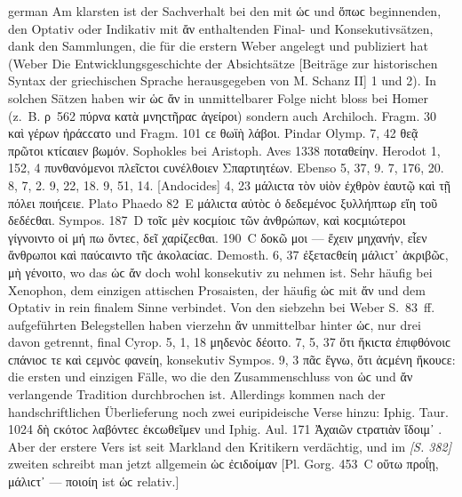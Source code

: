 \begin{otherlanguage*}{german}
Am klarsten ist der Sachverhalt bei den mit ὡϲ und ὅπωϲ beginnenden, den Optativ oder Indikativ mit ἄν enthaltenden Final- und Konsekutivsätzen, dank den Sammlungen, die für die erstern Weber angelegt und publiziert hat (Weber Die Entwicklungsgeschichte der Absichtsätze [Beiträge zur historischen Syntax der griechischen Sprache herausgegeben von M. Schanz II] 1 und 2). In solchen Sätzen haben wir ὡϲ ἄν in unmittelbarer Folge nicht bloss bei Homer (z.~B. ρ~562  πύρνα κατὰ μνηϲτῆραϲ ἀγείροι) sondern auch Archiloch. Fragm. 30  καὶ γέρων ἠράϲϲατο und Fragm. 101  ϲε θωϊὴ λάβοι. Pindar Olymp. 7, 42  θεᾷ πρῶτοι κτίϲαιεν βωμόν. Sophokles bei Aristoph. Aves 1338  ποταθείην. Herodot 1, 152, 4  πυνθανόμενοι πλεῖϲτοι ϲυνέλθοιεν Σπαρτιητέων. Ebenso 5, 37, 9. 7, 176, 20. 8, 7, 2. 9, 22, 18. 9, 51, 14. [Andocides] 4, 23  μάλιϲτα τὸν υἱὸν ἐχθρὸν ἑαυτῷ καὶ τῇ πόλει ποιήϲειε. Plato Phaedo 82~Ε  μάλιϲτα αὐτὸϲ ὁ δεδεμένοϲ ξυλλήπτωρ εἴη τοῦ δεδέϲθαι. Sympos. 187~D τοῖϲ μὲν κοϲμίοιϲ τῶν ἀνθρώπων, καὶ  κοϲμιώτεροι γίγνοιντο οἱ μή πω ὄντεϲ, δεῖ χαρίζεϲθαι. 190~C δοκῶ μοι — ἔχειν μηχανήν,  εἶεν ἄνθρωποι καὶ παύϲαιντο τῆϲ ἀκολαϲίαϲ. Demosth. 6, 37  ἐξεταϲθείη μάλιϲτ᾽ ἀκριβῶϲ, μὴ γένοιτο, wo das ὡϲ ἄν doch wohl konsekutiv zu nehmen ist. Sehr häufig bei Xenophon, dem einzigen attischen Prosaisten, der häufig ὡϲ mit ἄν und dem Optativ in rein finalem Sinne verbindet. Von den siebzehn bei Weber S.~83~ff. aufgeführten Belegstellen haben vierzehn ἄν unmittelbar hinter ὡϲ, nur drei davon getrennt, final Cyrop. 5, 1, 18  μηδενὸϲ  δέοιτο. 7, 5, 37  ὅτι ἥκιϲτα  ἐπιφθόνοιϲ ϲπάνιοϲ τε καὶ ϲεμνὸϲ φανείη, konsekutiv Sympos. 9, 3  πᾶϲ  ἔγνω, ὅτι ἀϲμένη ἤκουϲε: die ersten und einzigen Fälle, wo die den Zusammenschluss von ὡϲ und ἄν verlangende Tradition durchbrochen ist. Allerdings kommen nach der handschriftlichen Überlieferung noch zwei euripideische Verse hinzu: Iphig. Taur. 1024  δὴ ϲκότοϲ λαβόντεϲ ἐκϲωθεῖμεν  und Iphig. Aul. 171 Ἀχαιῶν ϲτρατιὰν  ἴδοιμ᾽ . Aber der erstere Vers ist seit Markland den Kritikern verdächtig, und im \hypertarget{p382}{\emph{[S. 382]}}\label{p382} zweiten schreibt man jetzt allgemein ὡϲ ἐϲιδοίμαν [Pl. Gorg. 453~C οὕτω προΐῃ,  μάλιϲτ᾽  — ποιοίη ist ὡϲ relativ.]


\end{otherlanguage*}
